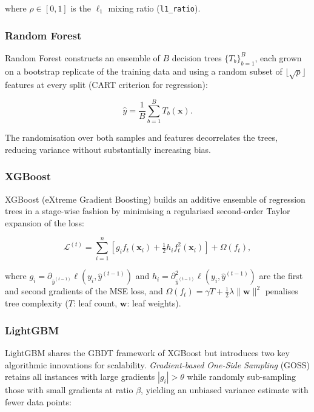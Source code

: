 where $\rho \in [0,1]$ is the $\ell_1$ mixing ratio (\texttt{l1\_ratio}).

\subsubsection{Random Forest}

Random Forest constructs an ensemble of $B$ decision trees
$\{T_b\}_{b=1}^B$, each grown on a bootstrap replicate of the training data
and using a random subset of $\lfloor\sqrt{p}\rfloor$ features at every split
(CART criterion for regression):

\begin{equation}
  \hat{y} = \frac{1}{B}\sum_{b=1}^{B} T_b(\mathbf{x}).
  \label{eq:rf}
\end{equation}

The randomisation over both samples and features decorrelates the trees,
reducing variance without substantially increasing bias.

\subsubsection{XGBoost}

XGBoost (eXtreme Gradient Boosting) builds an additive ensemble
of regression trees in a stage-wise fashion by minimising a regularised
second-order Taylor expansion of the loss:

\begin{equation}
  \mathcal{L}^{(t)} = \sum_{i=1}^{n}
  \left[g_i f_t(\mathbf{x}_i) + \tfrac{1}{2}h_i f_t^2(\mathbf{x}_i)\right]
  + \Omega(f_t),
  \label{eq:xgboost}
\end{equation}

where $g_i = \partial_{\hat{y}^{(t-1)}}\ell(y_i, \hat{y}^{(t-1)})$ and
$h_i = \partial^2_{\hat{y}^{(t-1)}}\ell(y_i, \hat{y}^{(t-1)})$ are the first
and second gradients of the MSE loss, and
$\Omega(f_t) = \gamma T + \tfrac{1}{2}\lambda\|\mathbf{w}\|^2$ penalises tree
complexity ($T$: leaf count, $\mathbf{w}$: leaf weights).

\subsubsection{LightGBM}

LightGBM shares the GBDT framework of XGBoost but introduces two key
algorithmic innovations for scalability.
\textit{Gradient-based One-Side Sampling} (GOSS) retains all instances
with large gradients $|g_i| > \theta$ while randomly sub-sampling those
with small gradients at ratio $\beta$, yielding an unbiased variance
estimate with fewer data points:

